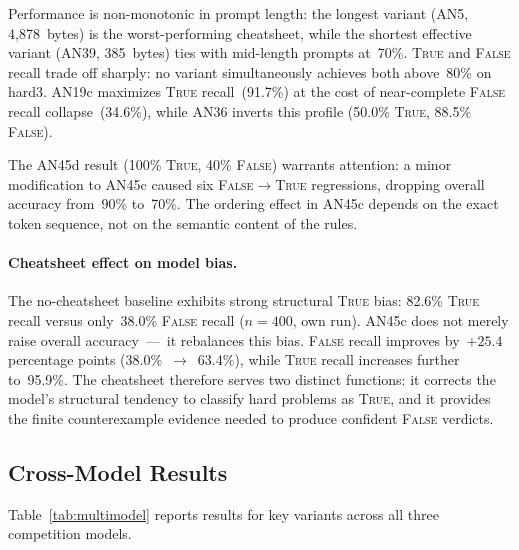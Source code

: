 \documentclass[11pt]{article}
\begin{document}
Performance is non-monotonic in prompt length: the longest variant
(AN5, 4{,}878~bytes) is the worst-performing cheatsheet, while the
shortest effective variant (AN39, 385~bytes) ties with mid-length
prompts at~70\%. \textsc{True} and \textsc{False} recall trade off
sharply: no variant simultaneously achieves both above~80\% on hard3.
AN19c maximizes \textsc{True} recall~(91.7\%) at the cost of
near-complete \textsc{False} recall collapse~(34.6\%), while AN36
inverts this profile (50.0\% \textsc{True}, 88.5\% \textsc{False}).

The AN45d result (100\% \textsc{True}, 40\% \textsc{False}) warrants
attention: a minor modification to AN45c caused six
\textsc{False}$\to$\textsc{True} regressions, dropping overall
accuracy from~90\% to~70\%. The ordering effect in AN45c depends on
the exact token sequence, not on the semantic content of the rules.

\paragraph{Cheatsheet effect on model bias.}
The no-cheatsheet baseline exhibits strong structural \textsc{True}
bias: 82.6\% \textsc{True} recall versus only~38.0\% \textsc{False}
recall ($n=400$, own run). AN45c does not merely raise overall
accuracy~---~it rebalances this bias. \textsc{False} recall improves
by~$+25.4$ percentage points (38.0\%~$\to$~63.4\%), while
\textsc{True} recall increases further to~95.9\%. The cheatsheet
therefore serves two distinct functions: it corrects the model's
structural tendency to classify hard problems as \textsc{True}, and
it provides the finite counterexample evidence needed to produce
confident \textsc{False} verdicts.

\subsection{Cross-Model Results}
\label{subsec:cross}

Table~\ref{tab:multimodel} reports results for key variants across all
three competition models.
\end{document}
